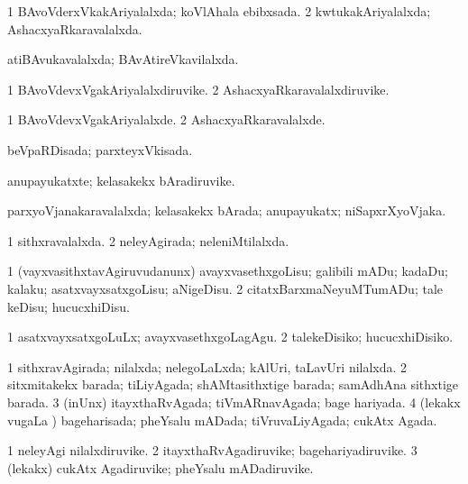 \bentry
{} 
\gl{\gu}
\expl{}
\bmng
\bnum
\num{1} BAvoVderxVkakAriyalalxda; koVlAhala ebibxsada. 
\num{2} kwtukakAriyalalxda; AshacxyaRkaravalalxda. 
\enum
\emng
\eentry

\bentry
{} 
\gl{\gu}
\expl{}
\bmng
atiBAvukavalalxda; BAvAtireVkavilalxda. 
\emng
\eentry

\bentry
{} 
\gl{\nA}
\expl{}
\bmng
\bnum
\num{1} BAvoVdevxVgakAriyalalxdiruvike. 
\num{2} AshacxyaRkaravalalxdiruvike. 
\enum
\emng
\eentry

\bentry
{} 
\gl{\kirxvi}
\expl{}
\bmng
\bnum
\num{1} BAvoVdevxVgakAriyalalxde. 
\num{2} AshacxyaRkaravalalxde. 
\enum
\emng
\eentry

\bentry
{} 
\gl{\gu}
\expl{}
\bmng
beVpaRDisada; parxteyxVkisada. 
\emng
\eentry

\bentry
{} 
\gl{\nA}
\expl{}
\bmng
anupayukatxte; kelasakekx bAradiruvike. 
\emng
\eentry

\bentry
{} 
\gl{\gu}
\expl{}
\bmng
parxyoVjanakaravalalxda; kelasakekx bArada; anupayukatx; niSapxrXyoVjaka. 
\emng
\eentry

\bentry
{} 
\gl{\gu}
\expl{}
\bmng
\bnum
\num{1} sithxravalalxda. 
\num{2} neleyAgirada; neleniMtilalxda. 
\enum
\emng
\eentry

\bentry
{} 
\gl{\sakirx}
\expl{}
\bmng
\bnum
\num{1} (vayxvasithxtavAgiruvudanunx) avayxvasethxgoLisu; galibili mADu; kadaDu; kalaku; asatxvayxsatxgoLisu; aNigeDisu. 
\num{2} citatxBarxmaNeyuMTumADu; tale keDisu; hucucxhiDisu. 
\enum
\emng

\noindent 
\gl{\akirx}
\expl{}
\bmng
\bnum
\num{1} asatxvayxsatxgoLuLx; avayxvasethxgoLagAgu. 
\num{2} talekeDisiko; hucucxhiDisiko. 
\enum
\emng
\eentry

\bentry
{} 
\gl{\gu}
\expl{}
\bmng
\bnum
\num{1} sithxravAgirada; nilalxda; nelegoLaLxda; kAlUri, taLavUri nilalxda. 
\num{2} sitxmitakekx barada; tiLiyAgada; shAMtasithxtige barada; samAdhAna sithxtige barada. 
\num{3} (inUnx) itayxthaRvAgada; tiVmARnavAgada; bage hariyada. 
\num{4} (lekakx \mo vugaLa \vi) bageharisada; pheYsalu mADada; tiVruvaLiyAgada; cukAtx Agada. 
\enum
\emng
\eentry

\bentry
{} 
\gl{\nA}
\expl{}
\bmng
\bnum
\num{1} neleyAgi nilalxdiruvike. 
\num{2} itayxthaRvAgadiruvike; bagehariyadiruvike. 
\num{3} (lekakx) cukAtx Agadiruvike; pheYsalu mADadiruvike. 
\enum
\emng
\eentry

